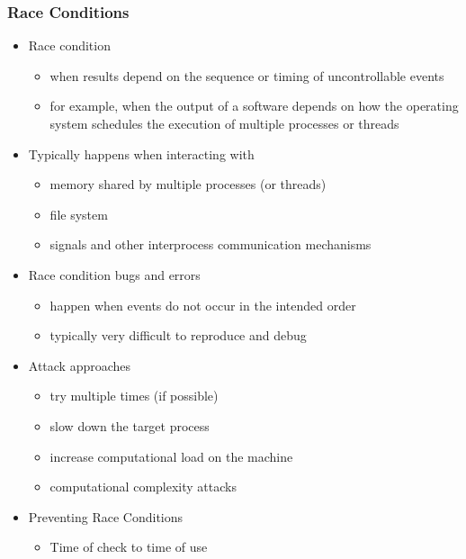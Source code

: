 \documentclass[final]{article}
\begin{document}
\subsubsection*{Race Conditions}
\begin{itemize}[nosep]
    \item Race condition
          \begin{itemize}[nosep]
              \item when results depend on the sequence or timing of uncontrollable events
              \item for example, when the output of a software depends on how the operating system schedules the execution of multiple processes or threads
          \end{itemize}
    \item Typically happens when interacting with
          \begin{itemize}[nosep]
              \item memory shared by multiple processes (or threads)
              \item file system
              \item signals and other interprocess communication mechanisms
          \end{itemize}
    \item Race condition bugs and errors
          \begin{itemize}[nosep]
              \item happen when events do not occur in the intended order
              \item typically very difficult to reproduce and debug
          \end{itemize}
    \item Attack approaches
          \begin{itemize}[nosep]
              \item try multiple times (if possible)
              \item slow down the target process
              \item increase computational load on the machine
              \item computational complexity attacks
          \end{itemize}
    \item Preventing Race Conditions
          \begin{itemize}
              \item Time of check to time of use
                    \begin{itemize}[nosep]

\end{itemize}
\end{itemize}
\end{itemize}
\end{document}
